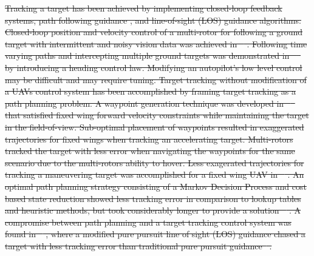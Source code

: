 \documentclass[conference]{IEEEtran}
\providecommand{\DIFdel}[1]{{\protect\color{red}\sout{#1}}}                      %
\providecommand{\DIFdelbegin}{} %
\newcommand{\DIFscaledelfig}{0.5}
\newlength{\DIFdelgraphicswidth} %
\newlength{\DIFdelgraphicsheight} %
\newcommand{\DIFdelincludegraphics}[2][]{%
\sbox{\DIFdelgraphicsbox}{\DIFOincludegraphics[#1]{#2}}%
\settoboxwidth{\DIFdelgraphicswidth}{\DIFdelgraphicsbox} %
\settoboxtotalheight{\DIFdelgraphicsheight}{\DIFdelgraphicsbox} %
\scalebox{\DIFscaledelfig}{%
\parbox[b]{\DIFdelgraphicswidth}{\usebox{\DIFdelgraphicsbox}\\[-\baselineskip] \rule{\DIFdelgraphicswidth}{0em}}\llap{\resizebox{\DIFdelgraphicswidth}{\DIFdelgraphicsheight}{%
\setlength{\unitlength}{\DIFdelgraphicswidth}%
\begin{picture}(1,1)%
\thicklines\linethickness{2pt} %
{\color[rgb]{1,0,0}\put(0,0){\framebox(1,1){}}}%
{\color[rgb]{1,0,0}\put(0,0){\line( 1,1){1}}}%
{\color[rgb]{1,0,0}\put(0,1){\line(1,-1){1}}}%
\end{picture}%
}\hspace*{3pt}}} %
} %
\DeclareRobustCommand{\DIFdelbegin}{\DIFOdelbegin \let\includegraphics\DIFdelincludegraphics} %
\begin{document}
\DIFdelbegin \DIFdel{Tracking a target has been achieved by implementing closed-loop feedback systems, path following guidance , and line-of-sight (LOS) guidance algorithms. Closed-loop position and velocity control of a multi-rotor for following a ground target with intermittent and noisy vision data was achieved in \mbox{%
\cite{teuliere_chasing_2011}}\hspace{0pt}%
. Following time varying paths and intercepting multiple ground targets was demonstrated in \mbox{%
\cite{oliveira_moving_2016} }\hspace{0pt}%
by introducing a heading control law. Modifying an autopilot's low level control may be difficult and may require tuning.
Target tracking without modification of a UAVs control system has been accomplished by framing target tracking as a path planning problem. A waypoint generation technique was developed in \mbox{%
\cite{ariyur_autonomous_2008} }\hspace{0pt}%
that satisfied fixed wing forward velocity constraints while maintaining the target in the field-of-view. Sub-optimal placement of waypoints resulted in exaggerated trajectories for fixed wings when tracking an accelerating target. Multi-rotors tracked the target with less error when navigating the waypoints for the same scenario due to the multi-rotors ability to hover. Less exagerated trajectories for tracking a maneuvering target was accomplished for a fixed wing UAV in \mbox{%
\cite{lee_strategies_2003}}\hspace{0pt}%
. An optimal path planning strategy consisting of a Markov Decision Process and cost based state reduction showed less tracking error in comparison to lookup tables and heuristic methods, but took considerably longer to provide a solution \mbox{%
\cite{baek_optimal_2013}}\hspace{0pt}%
. A compromise between path planning and a target tracking control system was found in \mbox{%
\cite{yamasaki_advanced_2009}}\hspace{0pt}%
, where a modified pure pursuit line of sight (LOS) guidance chased a target with less tracking error than traditional pure pursuit guidance\mbox{%
\cite{yamasaki_advanced_2009}}\hspace{0pt}%
. 
}%
\end{document}
